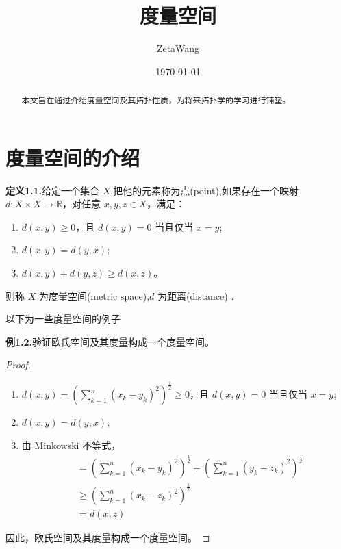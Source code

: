 \documentclass{article}
\title{度量空间}
\author{ZetaWang}
\date{\today}
\begin{document}
\maketitle

\begin{abstract}
本文旨在通过介绍度量空间及其拓扑性质，为将来拓扑学的学习进行铺垫。
\end{abstract}

\tableofcontents %

\section{度量空间的介绍}
\textbf{定义1.1.}给定一个集合 $X$,把他的元素称为点(point),如果存在一个映射 $d:X\times X\rightarrow \mathbb{R}$，对任意 $x,y,z\in X$，满足：
\begin{enumerate}[label={\textbullet}]
    \item $d(x,y)\geq 0$，且 $d(x,y) = 0$ 当且仅当 $x=y$;
    \item $d(x,y) = d(y,x)$;
    \item $d(x,y) + d(y,z) \geq d(x,z)$。
\end{enumerate}
则称 $X$ 为度量空间(metric space),$d$ 为距离(distance) .\setlength{\parskip}{1em} %

以下为一些度量空间的例子\setlength{\parskip}{1em} %

\textbf{例1.2.}验证欧氏空间及其度量构成一个度量空间。
\begin{proof}
    \leavevmode
    \begin{enumerate}[label={\textbullet}]
        \item $d(x,y) = (\sum\limits_{k=1}^{n}( x_k-y_k)^2)^{\frac{1}{2}} \geq 0$，且 $d(x,y) = 0$ 当且仅当 $x=y$;
        \item $d(x,y) = d(y,x)$;
        \item 由 Minkowski 不等式，
        \begin{align*}
            & = (\sum_{k=1}^{n}( x_k-y_k)^2)^\frac{1}{2} + (\sum_{k=1}^{n}( y_k-z_k)^2)^{\frac{1}{2}} \\
            & \geq (\sum_{k=1}^{n}( x_k-z_k)^2)^{\frac{1}{2}} \\
            & = d(x,z)
        \end{align*}
    \end{enumerate}
    因此，欧氏空间及其度量构成一个度量空间。
\end{proof}
\end{document}
